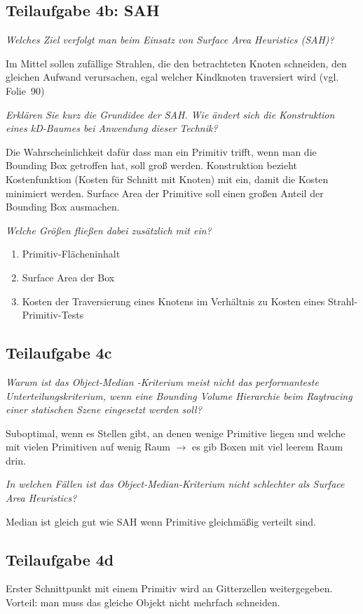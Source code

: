 \documentclass[a4paper]{scrartcl}
\begin{document}
\subsection*{Teilaufgabe 4b: SAH}
\textit{Welches Ziel verfolgt man beim Einsatz von Surface Area Heuristics (SAH)?}

Im Mittel sollen zufällige Strahlen, die den betrachteten Knoten schneiden, den
gleichen Aufwand verursachen, egal welcher Kindknoten traversiert wird (vgl.
Folie~90)

\textit{Erklären Sie kurz die Grundidee der SAH. Wie ändert sich die
Konstruktion eines kD-Baumes bei Anwendung dieser Technik?}

Die Wahrscheinlichkeit dafür dass man ein Primitiv trifft, wenn man die
Bounding Box getroffen hat, soll groß werden. Konstruktion bezieht
Kostenfunktion (Kosten für Schnitt mit Knoten) mit ein, damit die Kosten
minimiert werden. Surface Area der Primitive soll einen großen Anteil der
Bounding Box ausmachen.

\textit{Welche Größen fließen dabei zusätzlich mit ein?}
\begin{enumerate}[label=(\arabic*)]
    \item Primitiv-Flächeninhalt
    \item Surface Area der Box
    \item Kosten der Traversierung eines Knotens im Verhältnis zu Kosten eines Strahl-Primitiv-Tests
\end{enumerate}

\subsection*{Teilaufgabe 4c}
\textit{Warum ist das Object-Median -Kriterium meist nicht das performanteste
Unterteilungskriterium, wenn eine Bounding Volume Hierarchie beim Raytracing
einer statischen Szene eingesetzt werden soll?}

Suboptimal, wenn es Stellen gibt, an denen wenige Primitive liegen und welche
mit vielen Primitiven auf wenig Raum $\rightarrow$ es gib Boxen mit viel leerem
Raum drin.

\textit{In welchen Fällen ist das Object-Median-Kriterium nicht schlechter als
Surface Area Heuristics?}

Median ist gleich gut wie SAH wenn Primitive gleichmäßig verteilt
sind.

\subsection*{Teilaufgabe 4d}
Erster Schnittpunkt mit einem Primitiv wird an Gitterzellen weitergegeben.
Vorteil: man muss das gleiche Objekt nicht mehrfach schneiden.
\end{document}
